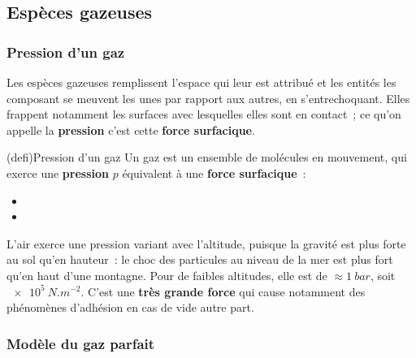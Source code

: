 \documentclass[../../main/main.tex]{subfiles}
\begin{document}
\subsection{Espèces gazeuses}
\subsubsection{Pression d'un gaz}
Les espèces gazeuses remplissent l'espace qui leur est attribué et les entités
les composant se meuvent les unes par rapport aux autres, en s'entrechoquant.
Elles frappent notamment les surfaces avec lesquelles elles sont en contact~;
ce qu'on appelle la \textbf{pression} c'est cette \textbf{force surfacique}.
\smallbreak

\begin{tcb}[label=def:pression, sidebyside,
		sidebyside align=top](defi){Pression d'un gaz}
	Un gaz est un ensemble de molécules en mouvement, qui exerce une
	\textbf{pression} $p$ équivalent à une \textbf{force surfacique}~:
	\psw{
		\[\boxed{p = \frac{F}{S}}\]
	}
	\tcblower
	\begin{itemize}
		\item {}
		\item {}
	\end{itemize}
	\vspace{-15pt}
\end{tcb}

L'air exerce une pression variant avec l'altitude, puisque la gravité
est plus forte au sol qu'en hauteur~: le choc des particules au niveau
de la mer est plus fort qu'en haut d'une montagne.
\smallbreak
Pour de faibles altitudes, elle est de $\approx \SI{1}{bar}$, soit
$\SI{e5}{N.m^{-2}}$. C'est une \textbf{très grande force} qui cause notamment
des phénomènes d'adhésion en cas de vide autre part.

\subsubsection{Modèle du gaz parfait}
\end{document}
